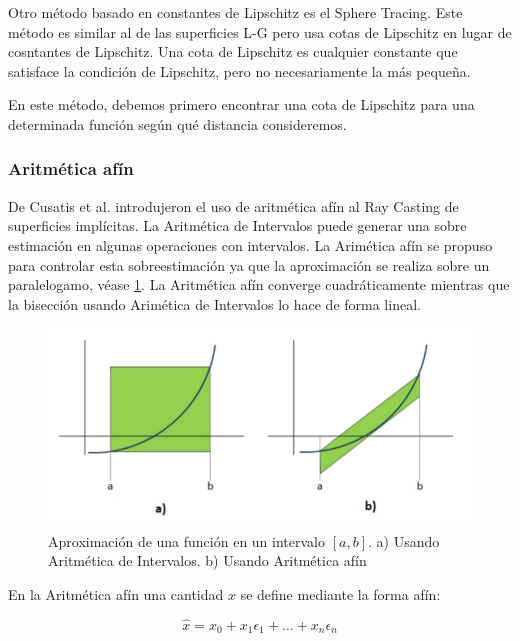 Otro método basado en constantes de Lipschitz es el Sphere Tracing. \cite{Hart96} Este método es similar al de las superficies L-G pero usa cotas de Lipschitz en lugar de cosntantes de Lipschitz. Una cota de Lipschitz es cualquier constante que satisface la condición de Lipschitz, pero no necesariamente la más pequeña.
\par En este método, debemos primero encontrar una cota de Lipschitz para una determinada función según qué distancia consideremos.

\subsubsection{Aritmética afín}

De Cusatis et al. \cite{Cusatis99} introdujeron el uso de aritmética afín al Ray Casting de superficies implícitas. La Aritmética de Intervalos puede generar una sobre estimación en algunas operaciones con intervalos. La Arimética afín se propuso para controlar  esta sobreestimación ya que la aproximación se realiza sobre un paralelogamo, véase \ref{florez413}. La Aritmética afín converge cuadráticamente mientras que la bisección usando Arimética de Intervalos lo hace de forma lineal.

\begin{figure}[h]
	\centering
	\includegraphics[scale=0.5]{images/florez10.png}
	\caption{Aproximación de una función en un intervalo $[a,b]$. a) Usando Aritmética de Intervalos. b) Usando Aritmética afín}
	\label{florez413}
\end{figure}

En la Aritmética afín una cantidad $x$ se define mediante la forma afín:

\begin{equation}
\hat{x} = x_0 + x_1 \epsilon_1 + \dotso + x_n \epsilon_n
\nonumber
\end{equation}

